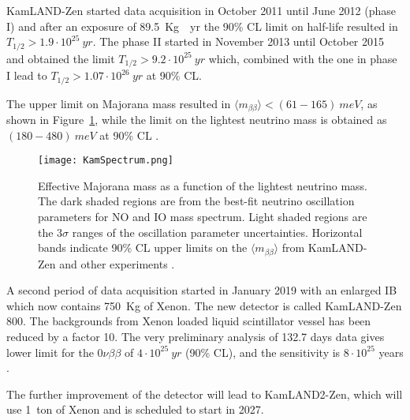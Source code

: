 \documentclass{subnucbo}
\begin{document}
KamLAND-Zen started data acquisition in October 2011 until June 2012 (phase I) and after an exposure of \SI{89.5}{Kg\cdot yr} the 90\% CL limit on half-life resulted in $T_{1/2}>1.9\cdot10^{25}\SI{}{yr}$.
The phase II started in November 2013 until October 2015 and obtained the limit  $T_{1/2}>9.2\cdot10^{25}\SI{}{yr}$ which, combined with the one in phase I lead to  $T_{1/2}>1.07\cdot10^{26}\SI{}{yr}$ at 90\% CL.

The upper limit on Majorana mass resulted in $\langle m_{\beta\beta}\rangle<(61-165)\SI{}{meV}$, as shown in  Figure~\ref{fig:kamSpec}, while the limit on the lightest neutrino mass is obtained as $(180-480)\SI{}{meV}$ at 90\% CL \cite{ref:kam}.
\begin{figure}
\centering
\texttt{[image: KamSpectrum.png]}
\caption{Effective Majorana mass as a function of the lightest neutrino mass. The dark shaded regions are from the best-fit neutrino oscillation parameters for NO and IO mass spectrum. Light shaded regions are the $3\sigma$ ranges of the oscillation parameter uncertainties. Horizontal bands indicate 90\% CL upper limits on the $\langle m_{\beta\beta}\rangle$ from KamLAND-Zen and other experiments \cite{ref:kam}.} %
\label{fig:kamSpec}
\end{figure}

A second period of data acquisition started in January 2019 with an enlarged IB which now contains \SI{750}{Kg} of Xenon. The new detector is called KamLAND-Zen 800.
The backgrounds from Xenon loaded liquid scintillator vessel has been reduced by a factor 10. The very preliminary analysis of 132.7 days data gives lower limit for the $0\nu\beta\beta$ of $4\cdot 10^{25}\SI{}{yr}$ (90\% CL), and the sensitivity is $8\cdot 10^{25}$ years \cite{ref:kam800}. 

The further improvement of the detector will lead to KamLAND2-Zen, which will use \SI{1}{ton} of Xenon and is scheduled to start in 2027.
\end{document}
